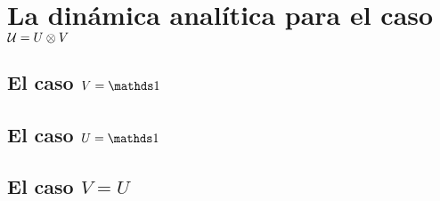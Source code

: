 \section{La dinámica analítica para el caso $\mathcal{U}=U\otimes V$}

\subsection{El caso $V=\Id$}

\subsection{El caso $U=\Id$}

\subsection{El caso $V=U$}
